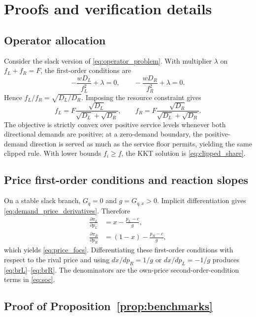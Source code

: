 \appendix
\section{Proofs and verification details}\label{app:proofs}

\subsection{Operator allocation}

Consider the slack version of \eqref{eq:operator_problem}. With multiplier $\lambda$ on $f_L+f_R=F$, the first-order conditions are
\begin{equation}
-\frac{wD_L}{f_L^2}+\lambda=0,
\qquad
-\frac{wD_R}{f_R^2}+\lambda=0.
\end{equation}
Hence $f_L/f_R=\sqrt{D_L/D_R}$. Imposing the resource constraint gives
\begin{equation}
f_L=F\frac{\sqrt{D_L}}{\sqrt{D_L}+\sqrt{D_R}},
\qquad
f_R=F\frac{\sqrt{D_R}}{\sqrt{D_L}+\sqrt{D_R}}.
\end{equation}
The objective is strictly convex over positive service levels whenever both directional demands are positive; at a zero-demand boundary, the positive-demand direction is served as much as the service floor permits, yielding the same clipped rule. With lower bounds $f_i\geq\underline f$, the KKT solution is \eqref{eq:clipped_share}.

\subsection{Price first-order conditions and reaction slopes}

On a stable slack branch, $G_q=0$ and $g=G_{q,x}>0$. Implicit differentiation gives \eqref{eq:demand_price_derivatives}. Therefore
\begin{align}
\frac{\partial\pi_L}{\partial p_L}
&=x-\frac{p_L-c}{g},\\
\frac{\partial\pi_R}{\partial p_R}
&=(1-x)-\frac{p_R-c}{g},
\end{align}
which yields \eqref{eq:price_focs}. Differentiating these first-order conditions with respect to the rival price and using $dx/dp_R=1/g$ or $dx/dp_L=-1/g$ produces \eqref{eq:brL}--\eqref{eq:brR}. The denominators are the own-price second-order-condition terms in \eqref{eq:soc}.

\subsection{Proof of Proposition~\ref{prop:benchmarks}}

